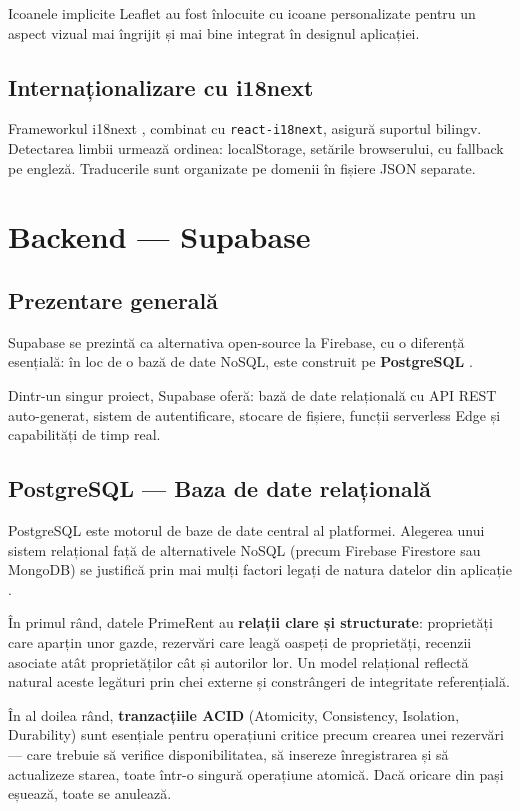\documentclass[12pt,a4paper,oneside]{report}
\begin{document}
Icoanele implicite Leaflet au fost înlocuite cu icoane personalizate pentru un aspect vizual mai îngrijit și mai bine integrat în designul aplicației.

\subsection{Internaționalizare cu i18next}

Frameworkul i18next \cite{i18next}, combinat cu \texttt{react-i18next}, asigură suportul bilingv. Detectarea limbii urmează ordinea: localStorage, setările browserului, cu fallback pe engleză. Traducerile sunt organizate pe domenii în fișiere JSON separate.


\section{Backend — Supabase}

\subsection{Prezentare generală}

Supabase se prezintă ca alternativa open-source la Firebase, cu o diferență esențială: în loc de o bază de date NoSQL, este construit pe \textbf{PostgreSQL} \cite{supabase}.

Dintr-un singur proiect, Supabase oferă: bază de date relațională cu API REST auto-generat, sistem de autentificare, stocare de fișiere, funcții serverless Edge și capabilități de timp real.

\subsection{PostgreSQL — Baza de date relațională}

PostgreSQL este motorul de baze de date central al platformei. Alegerea unui sistem relațional față de alternativele NoSQL (precum Firebase Firestore sau MongoDB) se justifică prin mai mulți factori legați de natura datelor din aplicație \cite{postgresql}.

În primul rând, datele PrimeRent au \textbf{relații clare și structurate}: proprietăți care aparțin unor gazde, rezervări care leagă oaspeți de proprietăți, recenzii asociate atât proprietăților cât și autorilor lor. Un model relațional reflectă natural aceste legături prin chei externe și constrângeri de integritate referențială.

În al doilea rând, \textbf{tranzacțiile ACID} (Atomicity, Consistency, Isolation, Durability) sunt esențiale pentru operațiuni critice precum crearea unei rezervări — care trebuie să verifice disponibilitatea, să insereze înregistrarea și să actualizeze starea, toate într-o singură operațiune atomică. Dacă oricare din pași eșuează, toate se anulează.
\end{document}
